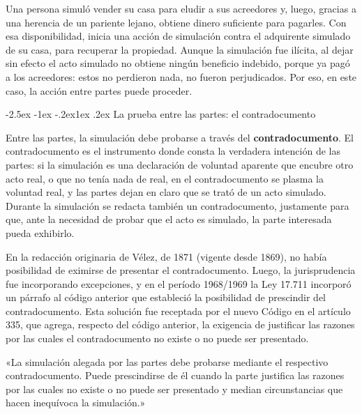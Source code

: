 \documentclass[12pt,oneside]{book}
\makeatletter
\renewcommand\subsection{\@startsection{subsection}{2}{\z@}%
  {-2.5ex \@plus -1ex \@minus -.2ex}{1ex \@plus .2ex}%
  {\normalfont\normalsize\bfseries}}
\makeatother
\begin{document}
\begin{ejemplo}
Una persona simuló vender su casa para eludir a sus acreedores y, luego, gracias a una herencia de un pariente lejano, obtiene dinero suficiente para pagarles. Con esa disponibilidad, inicia una acción de simulación contra el adquirente simulado de su casa, para recuperar la propiedad. Aunque la simulación fue ilícita, al dejar sin efecto el acto simulado no obtiene ningún beneficio indebido, porque ya pagó a los acreedores: estos no perdieron nada, no fueron perjudicados. Por eso, en este caso, la acción entre partes puede proceder.
\end{ejemplo}

\subsection{La prueba entre las partes: el contradocumento}

Entre las partes, la simulación debe probarse a través del \textbf{contradocumento}. El contradocumento es el instrumento donde consta la verdadera intención de las partes: si la simulación es una declaración de voluntad aparente que encubre otro acto real, o que no tenía nada de real, en el contradocumento se plasma la voluntad real, y las partes dejan en claro que se trató de un acto simulado. Durante la simulación se redacta también un contradocumento, justamente para que, ante la necesidad de probar que el acto es simulado, la parte interesada pueda exhibirlo.

En la redacción originaria de Vélez, de 1871 (vigente desde 1869), no había posibilidad de eximirse de presentar el contradocumento. Luego, la jurisprudencia fue incorporando excepciones, y en el período 1968/1969 la Ley 17.711 incorporó un párrafo al código anterior que estableció la posibilidad de prescindir del contradocumento. Esta solución fue receptada por el nuevo Código en el artículo 335, que agrega, respecto del código anterior, la exigencia de justificar las razones por las cuales el contradocumento no existe o no puede ser presentado.

\begin{regla}
«La simulación alegada por las partes debe probarse mediante el respectivo contradocumento. Puede prescindirse de él cuando la parte justifica las razones por las cuales no existe o no puede ser presentado y median circunstancias que hacen inequívoca la simulación.»
\end{regla}
\end{document}
